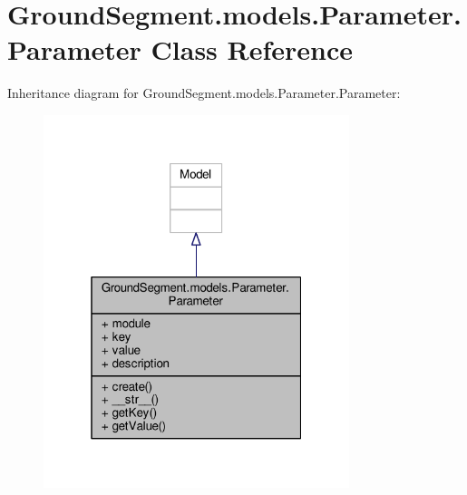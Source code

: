 \hypertarget{class_ground_segment_1_1models_1_1_parameter_1_1_parameter}{}\section{Ground\+Segment.\+models.\+Parameter.\+Parameter Class Reference}
\label{class_ground_segment_1_1models_1_1_parameter_1_1_parameter}


Inheritance diagram for Ground\+Segment.\+models.\+Parameter.\+Parameter\+:\nopagebreak
\begin{figure}[H]
\begin{center}
\leavevmode
\includegraphics[width=253pt]{class_ground_segment_1_1models_1_1_parameter_1_1_parameter__inherit__graph}
\end{center}
\end{figure}


